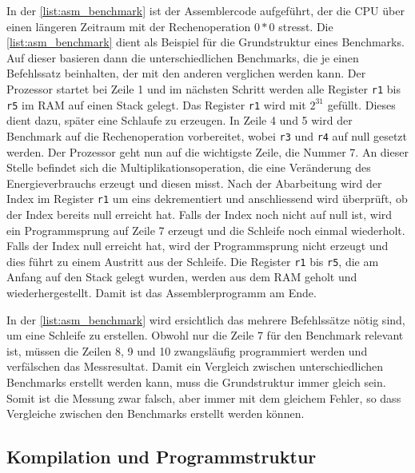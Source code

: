 In der \autoref{list:asm_benchmark} ist der Assemblercode aufgeführt, der die CPU über einen längeren Zeitraum mit der Rechenoperation $0*0$ stresst. Die \autoref{list:asm_benchmark} dient als Beispiel für die Grundstruktur eines Benchmarks. Auf dieser basieren dann die unterschiedlichen Benchmarks, die je einen Befehlssatz beinhalten, der mit den anderen verglichen werden kann. Der Prozessor startet bei Zeile 1 und im nächsten Schritt werden alle Register \texttt{r1} bis \texttt{r5} im RAM auf einen Stack gelegt. Das Register \texttt{r1} wird mit $2^{31}$ gefüllt. Dieses dient dazu, später eine Schlaufe zu erzeugen. In Zeile 4 und 5 wird der Benchmark auf die Rechenoperation vorbereitet, wobei \texttt{r3} und \texttt{r4} auf null gesetzt werden. Der Prozessor geht nun auf die wichtigste Zeile, die Nummer 7. An dieser Stelle befindet sich die Multiplikationsoperation, die eine Veränderung des Energieverbrauchs erzeugt und diesen misst. Nach der Abarbeitung wird der Index im Register \texttt{r1} um eins dekrementiert und anschliessend wird überprüft, ob der Index bereits null erreicht hat. Falls der Index noch nicht auf null ist, wird ein Programmsprung auf Zeile 7 erzeugt und die Schleife noch einmal wiederholt. Falls der Index null erreicht hat, wird der Programmsprung nicht erzeugt und dies führt zu einem Austritt aus der Schleife. Die Register \texttt{r1} bis \texttt{r5}, die am Anfang auf den Stack gelegt wurden, werden aus dem RAM geholt und wiederhergestellt. Damit ist das Assemblerprogramm am Ende.
\par
In der \autoref{list:asm_benchmark} wird ersichtlich das mehrere Befehlssätze nötig sind, um eine Schleife zu erstellen. Obwohl nur die Zeile 7 für den Benchmark relevant ist, müssen die Zeilen 8, 9 und 10 zwangsläufig programmiert werden und verfälschen das Messresultat. Damit ein Vergleich zwischen unterschiedlichen Benchmarks erstellt werden kann, muss die Grundstruktur immer gleich sein. Somit ist die Messung zwar falsch, aber immer mit dem gleichem Fehler, so dass Vergleiche zwischen den Benchmarks erstellt werden können.


\subsection{Kompilation und Programmstruktur}

